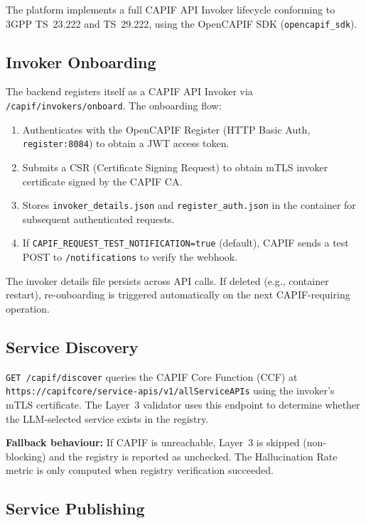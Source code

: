 \documentclass[conference]{IEEEtran}
\begin{document}
The platform implements a full CAPIF API Invoker lifecycle conforming to
3GPP TS~23.222 and TS~29.222, using the OpenCAPIF SDK
(\texttt{opencapif\_sdk}).

\subsection{Invoker Onboarding}

The backend registers itself as a CAPIF API Invoker via
\texttt{/capif/invokers/onboard}. The onboarding flow:

\begin{enumerate}[leftmargin=1.5em]
  \item Authenticates with the OpenCAPIF Register (HTTP Basic Auth,
        \texttt{register:8084}) to obtain a JWT access token.
  \item Submits a CSR (Certificate Signing Request) to obtain mTLS invoker
        certificate signed by the CAPIF CA.
  \item Stores \texttt{invoker\_details.json} and \texttt{register\_auth.json}
        in the container for subsequent authenticated requests.
  \item If \texttt{CAPIF\_REQUEST\_TEST\_NOTIFICATION=true} (default), CAPIF
        sends a test POST to \texttt{/notifications} to verify the webhook.
\end{enumerate}

The invoker details file persists across API calls. If deleted (e.g., container
restart), re-onboarding is triggered automatically on the next CAPIF-requiring
operation.

\subsection{Service Discovery}

\texttt{GET /capif/discover} queries the CAPIF Core Function (CCF) at
\texttt{https://capifcore/service-apis/v1/allServiceAPIs} using the invoker's
mTLS certificate. The Layer~3 validator uses this endpoint to determine whether
the LLM-selected service exists in the registry.

\textbf{Fallback behaviour:} If CAPIF is unreachable, Layer~3 is skipped
(non-blocking) and the registry is reported as unchecked. The Hallucination
Rate metric is only computed when registry verification succeeded.

\subsection{Service Publishing}
\end{document}
